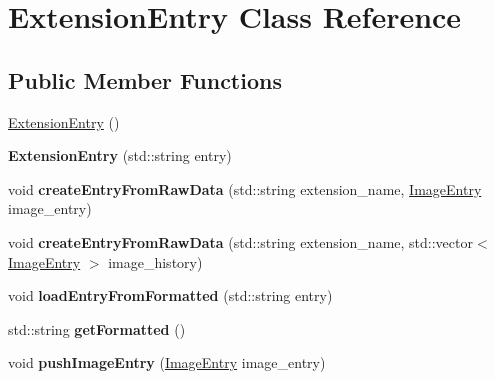 \hypertarget{class_extension_entry}{}\section{Extension\+Entry Class Reference}
\label{class_extension_entry}
\subsection*{Public Member Functions}
\begin{DoxyCompactItemize}
\item 
\hyperlink{class_extension_entry_a614b16ce172c8b81e0a127f61188152f}{Extension\+Entry} ()
\item 
\hypertarget{class_extension_entry_ac4454892358b61f11f095113e2da2ab7}{}{\bfseries Extension\+Entry} (std\+::string entry)\label{class_extension_entry_ac4454892358b61f11f095113e2da2ab7}

\item 
\hypertarget{class_extension_entry_a37d23a79c1d953fd11c5de76ea6e2e6d}{}void {\bfseries create\+Entry\+From\+Raw\+Data} (std\+::string extension\+\_\+name, \hyperlink{class_image_entry}{Image\+Entry} image\+\_\+entry)\label{class_extension_entry_a37d23a79c1d953fd11c5de76ea6e2e6d}

\item 
\hypertarget{class_extension_entry_ae550ab47783464b47313e82a9db0db90}{}void {\bfseries create\+Entry\+From\+Raw\+Data} (std\+::string extension\+\_\+name, std\+::vector$<$ \hyperlink{class_image_entry}{Image\+Entry} $>$ image\+\_\+history)\label{class_extension_entry_ae550ab47783464b47313e82a9db0db90}

\item 
\hypertarget{class_extension_entry_ad8c83e5374f51d16e6e47df1358b4ce2}{}void {\bfseries load\+Entry\+From\+Formatted} (std\+::string entry)\label{class_extension_entry_ad8c83e5374f51d16e6e47df1358b4ce2}

\item 
\hypertarget{class_extension_entry_ae42007cdd2857322ec451f154ff1be60}{}std\+::string {\bfseries get\+Formatted} ()\label{class_extension_entry_ae42007cdd2857322ec451f154ff1be60}

\item 
\hypertarget{class_extension_entry_ae56ccf8d17b885f92ef99de9d9bbcb1b}{}void {\bfseries push\+Image\+Entry} (\hyperlink{class_image_entry}{Image\+Entry} image\+\_\+entry)\label{class_extension_entry_ae56ccf8d17b885f92ef99de9d9bbcb1b}


\end{DoxyCompactItemize}
